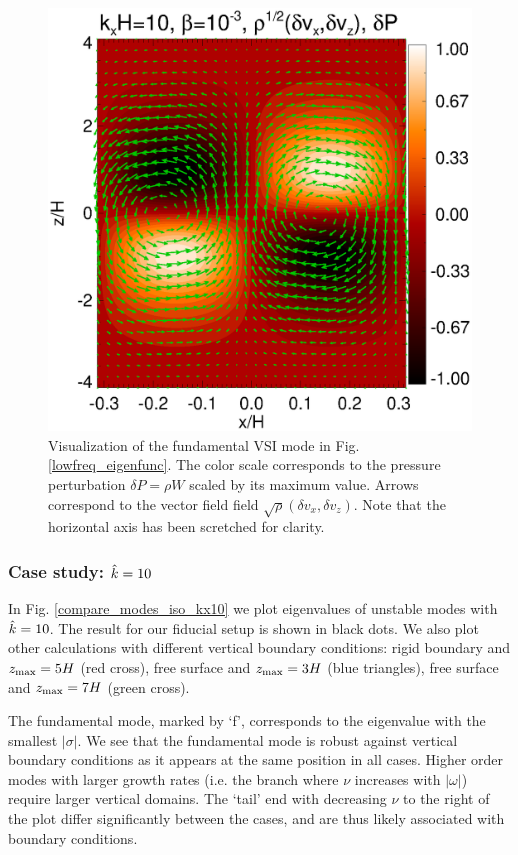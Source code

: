 \begin{figure}
  \includegraphics[width=\linewidth]{figures/result2d_iso}
  \caption{Visualization of the fundamental VSI mode in
    Fig. \ref{lowfreq_eigenfunc}. The color scale corresponds to the
    pressure perturbation $\delta P=\rho W$ scaled by its maximum value.
    Arrows correspond to the vector field field $\sqrt{\rho}(\delta
    v_x,\delta v_z)$. Note that the horizontal axis has been scretched
    for clarity.  
    \label{lowfreq_eigenfunc_2d}
  }
\end{figure}


\subsubsection{Case study: $\hat{k}=10$}
In Fig. \ref{compare_modes_iso_kx10} we plot eigenvalues of unstable
modes with $\hat{k}=10$. The result for our fiducial setup is shown
in black dots. We also plot other calculations with different
vertical boundary conditions: rigid boundary and $z_\mathrm{max}=5H$ (red
cross),  free surface and $z_\mathrm{max} = 3H$ (blue triangles), free surface
and $z_\mathrm{max}=7H$ (green cross). 

The fundamental mode, marked by `f', corresponds to the eigenvalue
with the smallest $|\sigma|$. We see that the fundamental mode is
robust against vertical boundary conditions as it appears at the same
position in all cases. Higher order modes with larger growth rates
(i.e. the branch where $\nu$ increases with $|\omega|$) require larger
vertical domains.  The `tail' end with decreasing $\nu$ to the right
of the plot differ significantly between the cases, and are thus
likely associated with boundary conditions. 

